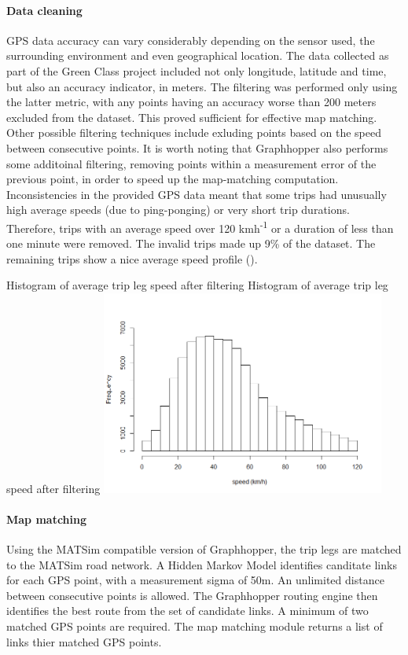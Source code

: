 \paragraph{Data cleaning}
GPS data accuracy can vary considerably depending on the sensor used, the surrounding environment and even geographical location.
The data collected as part of the Green Class project included not only longitude, latitude and time, but also an accuracy indicator, in meters.
The filtering was performed only using the latter metric, with any points having an accuracy worse than 200 meters excluded from the dataset.
This proved sufficient for effective map matching.
Other possible filtering techniques include exluding points based on the speed between consecutive points.
It is worth noting that Graphhopper also performs some additoinal filtering, removing points within a measurement error of the previous point, in order to speed up the map-matching computation.
Inconsistencies in the provided GPS data meant that some trips had unusually high average speeds (due to ping-ponging) or very short trip durations.
Therefore, trips with an average speed over 120 kmh\textsuperscript{-1} or a duration of less than one minute were removed.
The invalid trips made up 9\% of the dataset.
The remaining trips show a nice average speed profile ().

\createfigure%
	{Histogram of average trip leg speed after filtering}
	{Histogram of average trip leg speed after filtering}
    {\label{fig:avg_speeds}}
    {\includegraphics[width=0.7\textwidth]{figures/avg_speed_green_class_matched}}
	{}

\paragraph{Map matching}
Using the MATSim compatible version of Graphhopper, the trip legs are matched to the MATSim road network. A Hidden Markov Model \citep{newson2009hidden} identifies canditate links for each GPS point, with a measurement sigma of 50m. An unlimited distance between consecutive points is allowed. The Graphhopper routing engine then identifies the best route from the set of candidate links. A minimum of two matched GPS points are required. The map matching module returns a list of links thier matched GPS points.

